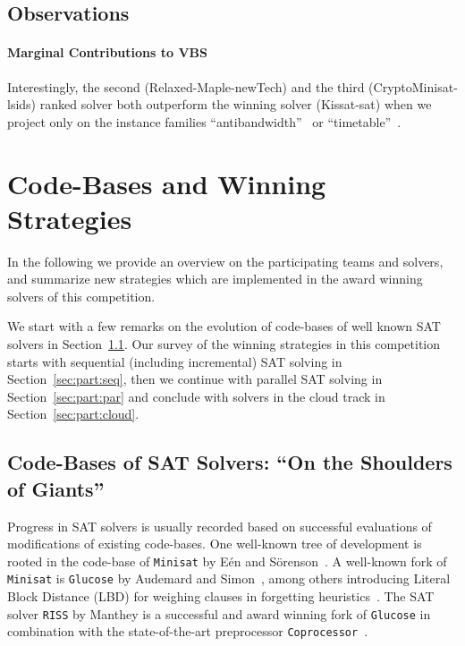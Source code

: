 \documentclass{elsarticle}
\newcommand{\solver}[1]{\texttt{#1}}
\begin{document}
\subsection{Observations}

\paragraph{Marginal Contributions to VBS} Interestingly, the second (Relaxed-Maple-newTech) and the third (CryptoMinisat-lsids) ranked solver both outperform the winning solver (Kissat-sat) when we project only on the instance families ``antibandwidth''~\cite{} or ``timetable''~\cite{}. 


\section{Code-Bases and Winning Strategies}
\label{sec:analysis}

In the following we provide an overview on the participating teams and solvers,  and summarize new strategies which are implemented in the award winning solvers of this competition. 

We start with a few remarks on the evolution of code-bases of well known SAT solvers in Section~\ref{sec:codebases}. 
Our survey of the winning strategies in this competition starts with sequential (including incremental) SAT solving in Section~\ref{sec:part:seq}, then we continue with parallel SAT solving in Section~\ref{sec:part:par} and conclude with solvers in the cloud track in Section~\ref{sec:part:cloud}. 


\subsection{Code-Bases of SAT Solvers: ``On the Shoulders of Giants''}
\label{sec:codebases}

Progress in SAT solvers is usually recorded based on successful evaluations of  modifications of existing code-bases. 
One well-known tree of development is rooted in the code-base of \solver{Minisat} by Eén and Sörenson~\cite{Niklas:2003:Minisat}. 
A well-known fork of \solver{Minisat} is \solver{Glucose} by Audemard and Simon~\cite{Audemard:2018:Glucose}, among others introducing Literal Block Distance (LBD) for weighing clauses in forgetting heuristics~\cite{Audemard:2009:Glucose}. 
The SAT solver \solver{RISS} by Manthey is a successful and award winning fork of \solver{Glucose} in combination with the state-of-the-art preprocessor \solver{Coprocessor}~\cite{Manthey:2012:Coprocessor2}. 
\end{document}
